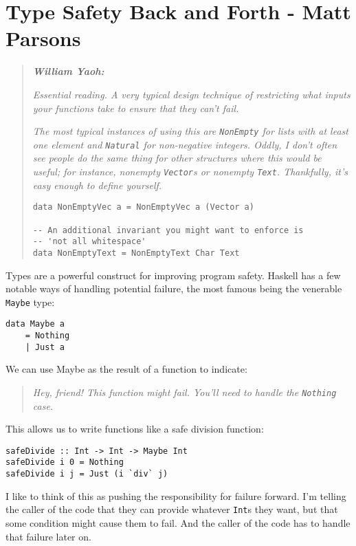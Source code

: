 \chapter{Type Safety Back and Forth - Matt Parsons}
\label{sec:type_safety_back_and_forth}

\begin{quotation}
\noindent\textit{\textbf{William Yaoh:}}

\textit{Essential reading. A very typical design technique of restricting what inputs your functions take to ensure that they can't fail.}

\textit{The most typical instances of using this are \texttt{NonEmpty} for lists with at least one element and \texttt{Natural} for non-negative integers. Oddly, I don't often see people do the same thing for other structures where this would be useful; for instance, nonempty \texttt{Vector}s or nonempty \texttt{Text}. Thankfully, it's easy enough to define yourself.}
\begin{verbatim}
data NonEmptyVec a = NonEmptyVec a (Vector a)

-- An additional invariant you might want to enforce is
-- 'not all whitespace'
data NonEmptyText = NonEmptyText Char Text
\end{verbatim}
\end{quotation}


Types are a powerful construct for improving program safety. Haskell has a few notable ways of handling potential failure, the most famous being the venerable \texttt{Maybe} type:

\begin{verbatim}
data Maybe a
    = Nothing
    | Just a
\end{verbatim}
We can use Maybe as the result of a function to indicate:
\begin{quotation}
\noindent \textit{Hey, friend! This function might fail. You'll need to handle the \texttt{Nothing} case.                                                                             } 
\end{quotation} 
This allows us to write functions like a safe division function:

\begin{verbatim}
safeDivide :: Int -> Int -> Maybe Int
safeDivide i 0 = Nothing
safeDivide i j = Just (i `div` j)
\end{verbatim}

I like to think of this as pushing the responsibility for failure forward. I'm telling the caller of the code that they can provide whatever \texttt{Int}s they want, but that some condition might cause them to fail. And the caller of the code has to handle that failure later on.

